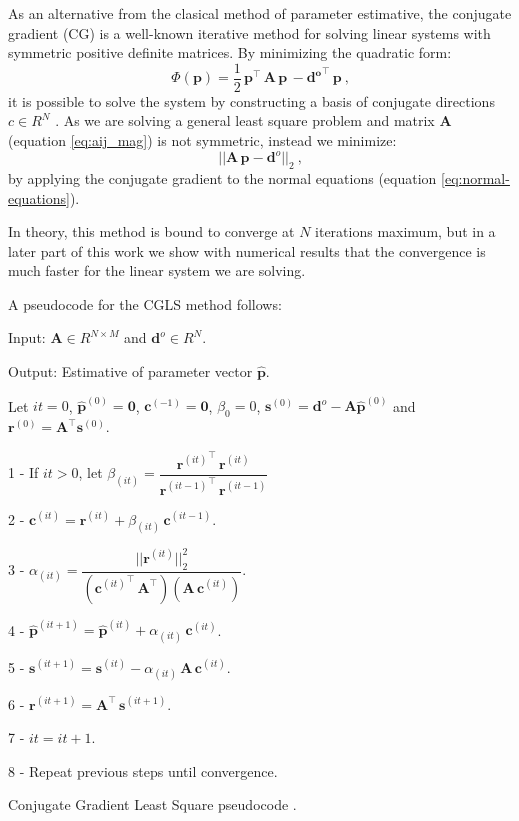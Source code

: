 As an alternative from the clasical method of parameter estimative, the conjugate gradient (CG) is a well-known iterative method for solving linear systems with symmetric positive definite matrices. By minimizing the quadratic form:
\begin{equation}
\, \Phi(\mathbf{p}) = \frac{1}{2} \, \mathbf{p}^{\top} \, \mathbf{A} \, \mathbf{p} \,
- \mathbf{{d}^{o}}^{\top} \, \mathbf{p}\: ,
\label{eq:estimated-p-cg}
\end{equation}
it is possible to solve the system by constructing a basis of conjugate directions $c \in R^N$ \citep{aster2018parameter}. As we are solving a general least square problem and matrix $\mathbf{A}$ (equation \ref{eq:aij_mag}) is not symmetric, instead we minimize:
\begin{equation}
\, || \mathbf{A} \, \mathbf{p} - \mathbf{d}^o||_2 \: ,
\label{eq:estimated-p-cgls}
\end{equation}
by applying the conjugate gradient to the normal equations (equation \ref{eq:normal-equations}).

In theory, this method is bound to converge at $N$ iterations maximum, but in a later part of this work we show with numerical results that the convergence is much faster for the linear system we are solving.

A pseudocode for the CGLS method follows:

\begin{algorithm}[H]
	Input: $\mathbf{A} \in R^{N \times M} $ and $\mathbf{d}^o \in R^N$.
	
	Output: Estimative of parameter vector $\hat{\mathbf{p}}$.
	
	Let $it = 0$, $\hat{\mathbf{p}}^{(0)} = {\mathbf{0}}$, $\mathbf{c}^{(-1)} = {\mathbf{0}}$, $\beta_0 = 0$, $\mathbf{s}^{(0)} = \mathbf{d}^{o} - \mathbf{A} \hat{\mathbf{p}}^{(0)}$ and $\mathbf{r}^{(0)} = \mathbf{A}^{\top} \mathbf{s}^{(0)}$.
	
	1 - If $it > 0$, let $\beta_{(it)} = \dfrac{{\mathbf{r}^{(it)}}^{\top} \, \mathbf{r}^{(it)}} {{\mathbf{r}^{(it - 1)}}^{\top} \, \mathbf{r}^{(it - 1)}}$
	
	2 - $\mathbf{c}^{(it)} = \mathbf{r}^{(it)} + \beta_{(it)} \, \mathbf{c}^{(it - 1)}$.
	
	3 - $\alpha_{(it)} = \dfrac{{||\mathbf{r}^{(it)}||^2_2}}{({\mathbf{c}^{(it)}}^{\top} \, \mathbf{A}^{\top})(\mathbf{A} \, \mathbf{c}^{(it)})}$.
	
	4 - $\hat{\mathbf{p}}^{(it + 1)} = \hat{\mathbf{p}}^{(it)} + \alpha_{(it)} \, \mathbf{c}^{(it)}$.
	
	5 - $\mathbf{s}^{(it + 1)} = \mathbf{s}^{(it)} - \alpha_{(it)} \, \mathbf{A} \, \mathbf{c}^{(it)}$.
	
	6 - $\mathbf{r}^{(it + 1)} = \mathbf{A}^{\top} \, \mathbf{s}^{(it + 1)}$.
	
	7 - $it = it + 1$.
	
	8 - Repeat previous steps until convergence.
	
	\caption{Conjugate Gradient Least Square pseudocode \citep[][ p. 166]{aster2018parameter}.}
\label{al:cgls-algorithm}
\end{algorithm}

